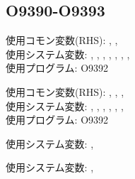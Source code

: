 \subsection{O9390-O9393}
\begin{hosoku}\small
使用コモン変数(RHS): , , \\
使用システム変数: , , , , , , , \\
使用プログラム: O9392
\end{hosoku}

\begin{hosoku}\small
使用コモン変数(RHS): , , , \\
使用システム変数: , , , , , , \\
使用プログラム: O9392
\end{hosoku}

\begin{hosoku}\small
使用システム変数: , 
\end{hosoku}

\begin{hosoku}\small
使用システム変数: , 
\end{hosoku}
